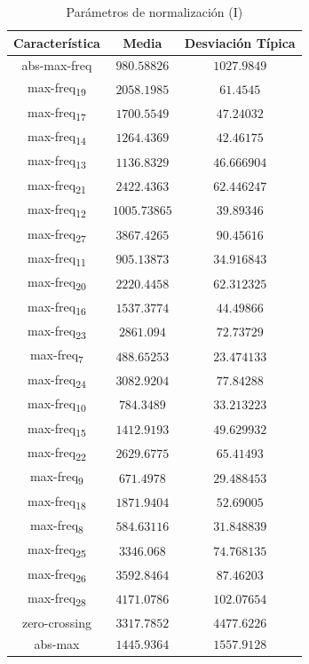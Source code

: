 \documentclass[12pt]{article}
\begin{document}
\begin{table}
	\caption{Parámetros de normalización (I)}
	\centering
		\begin{tabular}{||c c c||}
			\hline
			Característica & Media & Desviación Típica \\ [0.5ex]
			\hline\hline
			abs-max-freq & $980.58826$ & $1027.9849$ \\
			\hline
			max-freq\textsubscript{19} & $2058.1985$ & $61.4545$ \\
			\hline
			max-freq\textsubscript{17} & $1700.5549$ & $47.24032$ \\
			\hline
			max-freq\textsubscript{14} & $1264.4369$ & $42.46175$ \\
			\hline
			max-freq\textsubscript{13} & $1136.8329$ & $46.666904$ \\
			\hline
			max-freq\textsubscript{21} & $2422.4363$ & $62.446247$ \\
			\hline
			max-freq\textsubscript{12} & $1005.73865$ & $39.89346$ \\
			\hline
			max-freq\textsubscript{27} & $3867.4265$ & $90.45616$ \\
			\hline
			max-freq\textsubscript{11} & $905.13873$ & $34.916843$ \\
			\hline
			max-freq\textsubscript{20} & $2220.4458$ & $62.312325$ \\
			\hline
			max-freq\textsubscript{16} & $1537.3774$ & $44.49866$ \\
			\hline
			max-freq\textsubscript{23} & $2861.094$ & $72.73729$ \\
			\hline
			max-freq\textsubscript{7} & $488.65253$ & $23.474133$ \\
			\hline
			max-freq\textsubscript{24} & $3082.9204$ & $77.84288$ \\
			\hline
			max-freq\textsubscript{10} & $784.3489$ & $33.213223$ \\
			\hline
			max-freq\textsubscript{15} & $1412.9193$ & $49.629932$ \\
			\hline
			max-freq\textsubscript{22} & $2629.6775$ & $65.41493$ \\
			\hline
			max-freq\textsubscript{9} & $671.4978$ & $29.488453$ \\
			\hline
			max-freq\textsubscript{18} & $1871.9404$ & $52.69005$ \\
			\hline
			max-freq\textsubscript{8} & $584.63116$ & $31.848839$ \\
			\hline
			max-freq\textsubscript{25} & $3346.068$ & $74.768135$ \\
			\hline
			max-freq\textsubscript{26} & $3592.8464$ & $87.46203$ \\
			\hline
			max-freq\textsubscript{28} & $4171.0786$ & $102.07654$ \\
			\hline
			zero-crossing & $3317.7852$ & $4477.6226$ \\
			\hline
			abs-max & $1445.9364$ & $1557.9128$ \\
			\hline
			
		\end{tabular}
	\label{Tab:Features_5_1}
\end{table}
\end{document}
